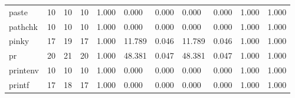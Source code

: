 \begin{longtable}{lp{1.8cm}p{1.8cm}p{1.8cm}p{1.8cm}p{1.8cm}p{1.8cm}p{1.8cm}p{1.8cm}p{1.8cm}p{1.8cm}}
paste     &                           10 &                 10 &                                10 &                                      1.000 &                                  0.000 &                                        0.000 &                             0.000 &                                   0.000 &                              1.000 &                                              1.000 \\
pathchk   &                           10 &                 10 &                                10 &                                      1.000 &                                  0.000 &                                        0.000 &                             0.000 &                                   0.000 &                              1.000 &                                              1.000 \\
pinky     &                           17 &                 19 &                                17 &                                      1.000 &                                 11.789 &                                        0.046 &                            11.789 &                                   0.046 &                              1.000 &                                              1.000 \\
pr        &                           20 &                 21 &                                20 &                                      1.000 &                                 48.381 &                                        0.047 &                            48.381 &                                   0.047 &                              1.000 &                                              1.000 \\
printenv  &                           10 &                 10 &                                10 &                                      1.000 &                                  0.000 &                                        0.000 &                             0.000 &                                   0.000 &                              1.000 &                                              1.000 \\
printf    &                           17 &                 18 &                                17 &                                      1.000 &                                  0.000 &                                        0.000 &                             0.000 &                                   0.000 &                              1.000 &                                              1.000 \\

\end{longtable}
